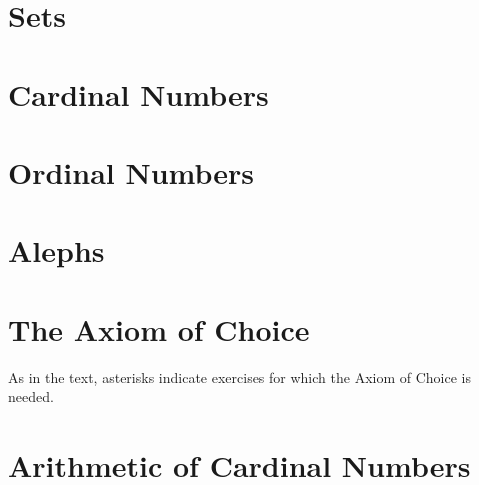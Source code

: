 \begin{questions}

  \setcounter{section}{1-1}

  \section{Sets}
  \setcounter{subsection}{3-1}
  
  

  \setcounter{section}{5-1}

  \section{Cardinal Numbers}
  
  

  \section{Ordinal Numbers}
  
  
  
  
  
  

  \section{Alephs}
  
  

  \section{The Axiom of Choice}
  As in the text, asterisks indicate exercises for which the Axiom of Choice is needed.
  
  

  \section{Arithmetic of Cardinal Numbers}
  
  

\end{questions}

